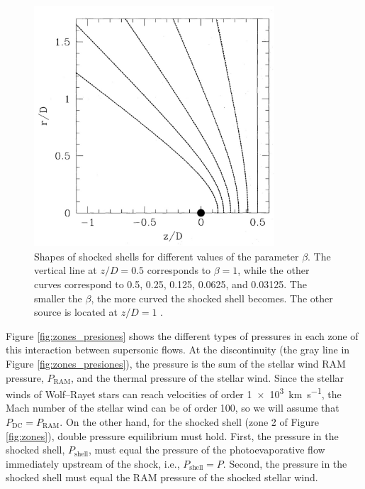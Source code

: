 \documentclass{book}
\begin{document}
\begin{figure}[htb]
    \centering    \includegraphics[width=0.8\textwidth]{images Chapter 2/C2_Canto2.jpg}
    \caption{Shapes of shocked shells for different values of the
      parameter $\beta$. The vertical line at $z/D=0.5$ corresponds to
      $\beta=1$, while the other curves correspond to 0.5, 0.25,
      0.125, 0.0625, and 0.03125. The smaller the $\beta$, the more
      curved the shocked shell becomes. The other source is located at
      $z/D=1$ \citep{Canto:1996}.}
    \label{fig:Canto2}
\end{figure}

Figure \ref{fig:zones_presiones} shows the different types of
pressures in each zone of this interaction between supersonic flows.
At the discontinuity (the gray line in Figure
\ref{fig:zones_presiones}), the pressure is the sum of the stellar
wind RAM pressure, $P_\mathrm{RAM}$, and the thermal pressure of the
stellar wind. Since the stellar winds of Wolf--Rayet stars can reach
velocities of order \SI{1e3}{km.s^{-1}}, the Mach number of the
stellar wind can be of order 100, so we will assume that
$P_\mathrm{DC}=P_\mathrm{RAM}$. On the other hand, for the shocked
shell (zone 2 of Figure \ref{fig:zones}), double pressure equilibrium
must hold. First, the pressure in the shocked shell,
$P_\mathrm{shell}$, must equal the pressure of the photoevaporative
flow immediately upstream of the shock, i.e.,
$P_\mathrm{shell}=P$. Second, the pressure in the shocked shell must
equal the RAM pressure of the shocked stellar wind.
\end{document}
